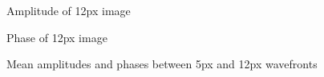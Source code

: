 \documentclass[12pt,a4paper,english
]{tunithesis}
\begin{document}
\begin{figure}[p]
    \centering
    \caption{Amplitude of 12px image}
    \label{fig:my_label}
\end{figure}

\begin{figure}[p]
    \centering
    \caption{Phase of 12px image}
    \label{fig:my_label}
\end{figure}

\begin{figure}[p]
    \centering
    \caption{Mean amplitudes and phases between 5px and 12px wavefronts}
    \label{fig:my_label}
\end{figure}
\end{document}
